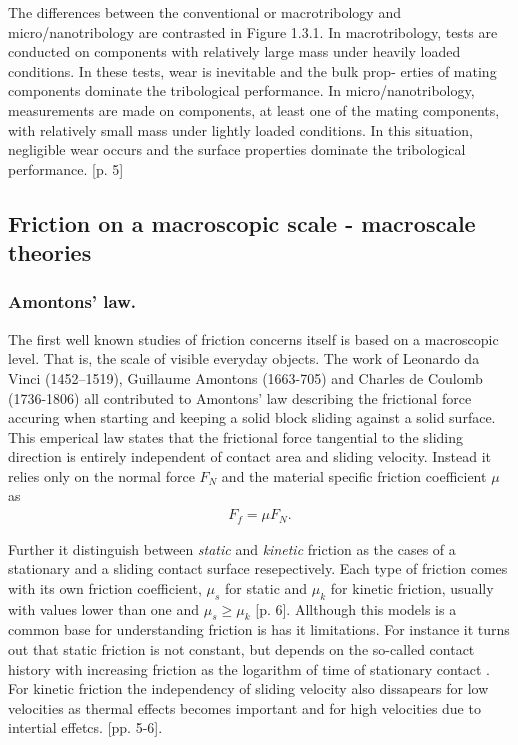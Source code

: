 The differences between the conventional or macrotribology and micro/nanotribology are contrasted in Figure 1.3.1. In macrotribology, tests are conducted on components with relatively large mass under heavily loaded conditions. In these tests, wear is inevitable and the bulk prop- erties of mating components dominate the tribological performance. In micro/nanotribology, measurements are made on components, at least one of the mating components, with relatively small mass under lightly loaded conditions. In this situation, negligible wear occurs and the surface properties dominate the tribological performance.
\cite{bhushan_2013}[p. 5]


\subsection{Friction on a macroscopic scale - macroscale theories}
\subsubsection {Amontons’ law. }
The first well known studies of friction concerns itself is based on a macroscopic level. That is, the scale of visible everyday objects. The work of Leonardo da Vinci (1452–1519), Guillaume Amontons (1663-705) and Charles de Coulomb (1736-1806) all contributed to Amontons’ law describing the frictional force accuring when starting and keeping a solid block sliding against a solid surface. This emperical law states that the frictional force tangential to the sliding direction is entirely independent of contact area and sliding velocity. Instead it relies only on the normal force $F_N$ and the material specific friction coefficient $\mu$ as
\begin{align*}
  F_f = \mu F_N.
\end{align*}

Further it distinguish between \textit{static} and \textit{kinetic} friction as the cases of a stationary and a sliding contact surface resepectively. Each type of friction comes with its own friction coefficient, $\mu_s$ for static and $\mu_k$ for kinetic friction, usually with values lower than one and $\mu_s \ge \mu_k$ \cite{gnecco_meyer_2015}[p. 6]. Allthough this models is a common base for understanding friction is has it limitations. For instance it turns out that static friction is not constant, but depends on the so-called contact history with increasing friction as the logarithm of time of stationary contact \cite{dieterich_1972}. For kinetic friction the independency of sliding velocity also dissapears for low velocities as thermal effects becomes important and for high velocities due to intertial effetcs. \cite{gnecco_meyer_2015}[pp. 5-6].
\par 

